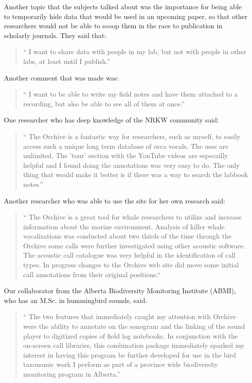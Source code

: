Another topic that the subjects talked about was the importance for
being able to temporarily hide data that would be used in an upcoming
paper, so that other researchers would not be able to scoop them in
the race to publication in scholarly journals.  They said that:

\begin{quote}
`` I want to share data with people in my lab, but not with people in
  other labs, at least until I publish.''
\end{quote}

Another comment that was made was:

\begin{quote}
`` I want to be able to write my field notes and have them attached to
  a recording, but also be able to see all of them at once.''
\end{quote}


One researcher who has deep knowledge of the NRKW community said:

\begin{quote}
`` The Orchive is a fantastic way for researchers, such as myself, to
  easily access such a unique long term database of orca vocals. The
  uses are unlimited. The 'tour' section with the YouTube videos are
  especailly helpful and I found doing the annotations was very easy
  to do. The only thing that would make it better is if there was a
  way to search the labbook notes.''
\end{quote}

Another researcher who was able to use the site for her own research
said:

\begin{quote}
`` The Orchive is a great tool for whale researchers to utilize and
  increase information about the marine environment.  Analysis of
  killer whale vocalizations was conducted about two thirds of the
  time through the Orchive some calls were further investigated using
  other acoustic software. The acoustic call catalogue was very
  helpful in the identification of call types.  In progress changes to
  the Orchive web site did move some initial call annotations from
  their original positions.``
\end{quote}

Our collaborator from the Alberta Biodiversity Monitoring Institute
(ABMI), who has an M.Sc. in hummingbird sounds, said:

\begin{quote}
`` The two features that immediately caught my attention with Orchive
  were the ability to annotate on the sonogram and the linking of the
  sound player to digitized copies of field log notebooks.  In
  conjunction with the on-screen call libraries, this combination
  package immediately sparked my interest in having this program be
  further developed for use in the bird taxonomic work I perform as
  part of a province wide biodiversity monitoring program in
  Alberta.''
\end{quote}

